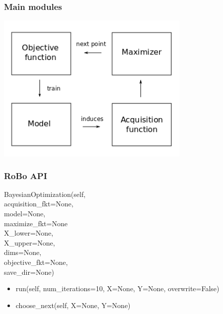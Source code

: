 \documentclass[10pt,handout]{beamer}
\begin{document}
\begin{frame}
\frametitle{Main modules}

\begin{center}
\includegraphics[width=0.7\textwidth]{robo_framework.png}
\end{center}


\end{frame}
\begin{frame}

\frametitle{RoBo API}
BayesianOptimization(self, \\
\hspace{1cm} acquisition\_fkt=None, \\
\hspace{1cm} model=None, \\
\hspace{1cm} maximize\_fkt=None \\
\hspace{1cm} X\_lower=None, \\
\hspace{1cm} X\_upper=None, \\
\hspace{1cm} dims=None, \\
\hspace{1cm} objective\_fkt=None, \\
\hspace{1cm} save\_dir=None)
\begin{itemize}
\item run(self, num\_iterations=10, X=None, Y=None, overwrite=False)
\item choose\_next(self, X=None, Y=None)
\end{itemize}

\end{frame}
\end{document}
